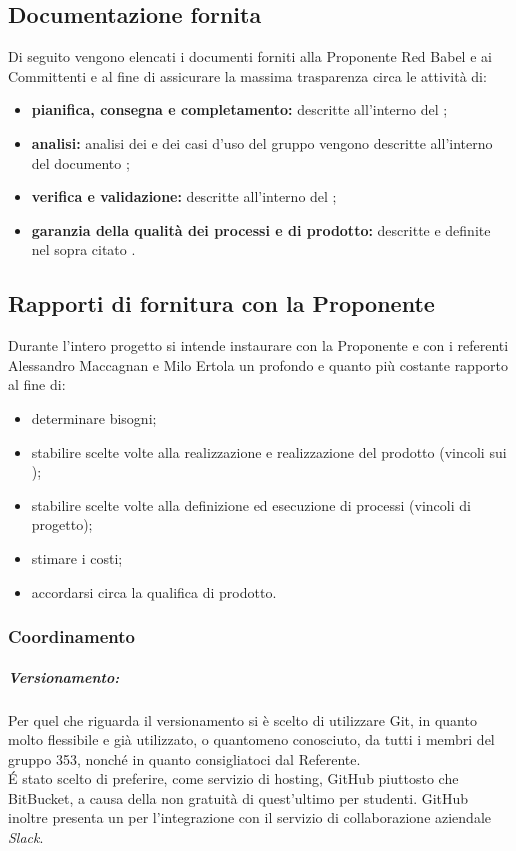 \subsection{Documentazione fornita}
Di seguito vengono elencati i documenti forniti alla Proponente Red Babel e ai Committenti \Vardanega{} e \Cardin{} al fine di assicurare la massima trasparenza circa le attività di:
\begin{itemize}
	\item \textbf{pianifica, consegna e completamento:} descritte all'interno del \pdp \vruno;
	\item \textbf{analisi:} analisi dei  e dei casi d'uso del gruppo vengono descritte all'interno del documento \adr \vruno;
	\item \textbf{verifica e validazione:} descritte all'interno del \pdq \vruno;
	\item \textbf{garanzia della qualità dei processi e di prodotto:} descritte e definite nel sopra citato \pdq \vruno.
\end{itemize}

\subsection{Rapporti di fornitura con la Proponente \Proponente}
Durante l'intero progetto si intende instaurare con la Proponente \Proponente{} e con i referenti Alessandro Maccagnan e Milo Ertola un profondo e quanto più costante rapporto al fine di:
\begin{itemize}
	\item determinare bisogni;
	\item stabilire scelte volte alla realizzazione e realizzazione del prodotto (vincoli sui );
	\item stabilire scelte volte alla definizione ed esecuzione di processi (vincoli di progetto);
	\item stimare i costi;
	\item accordarsi circa la qualifica di prodotto.
\end{itemize}


	\subsubsection{Coordinamento}
\subparagraph{Versionamento:} Per quel che riguarda il versionamento si è scelto di utilizzare Git, in quanto molto flessibile e già utilizzato, o quantomeno conosciuto, da tutti i membri del gruppo 353, nonché in quanto consigliatoci dal Referente.\\
\'{E} stato scelto di preferire, come servizio di hosting, GitHub piuttosto che BitBucket, a causa della non gratuità di quest'ultimo per studenti. GitHub inoltre presenta un  per l'integrazione con il servizio di collaborazione aziendale \emph{Slack}.


